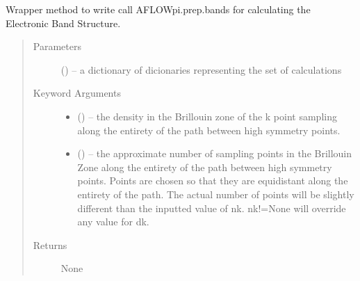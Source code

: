 \documentclass[letterpaper,10pt,english]{sphinxmanual}
\begin{document}
\begin{fulllineitems}
\begin{fulllineitems}
\end{fulllineitems}


\begin{fulllineitems}
\label{\detokenize{prep:prep.calcs_container.addToAll}}
\end{fulllineitems}


\begin{fulllineitems}
\label{\detokenize{prep:prep.calcs_container.bands}}
Wrapper method to write call AFLOWpi.prep.bands for calculating the Electronic Band
Structure.
\begin{quote}\begin{description}
\item[{Parameters}] \leavevmode
{} () -- a dictionary of dicionaries representing the set of calculations

\item[{Keyword Arguments}] \leavevmode\begin{itemize}
\item {} 
 () -- the density in the Brillouin zone of the k point sampling along the
entirety of the path between high symmetry points.

\item {} 
 () -- the approximate number of sampling points  in the Brillouin Zone along
the entirety of the path between high symmetry points. Points are
chosen so that they are equidistant along the entirety of the path.
The actual number of points will be slightly different than the
inputted value of nk. nk!=None will override any value for dk.

\end{itemize}

\item[{Returns}] \leavevmode
None

\end{description}\end{quote}

\end{fulllineitems}


\end{fulllineitems}
\end{document}
